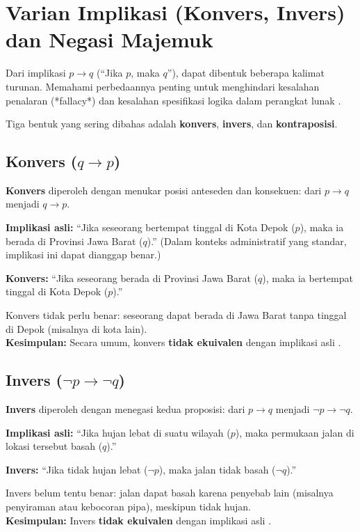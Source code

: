 \section{Varian Implikasi (Konvers, Invers) dan Negasi Majemuk}

Dari implikasi $p \rightarrow q$ (``Jika $p$, maka $q$''), dapat dibentuk beberapa kalimat turunan. Memahami perbedaannya penting untuk menghindari kesalahan penalaran (*fallacy*) dan kesalahan spesifikasi logika dalam perangkat lunak \cite{rosen2019}.

Tiga bentuk yang sering dibahas adalah \textbf{konvers}, \textbf{invers}, dan \textbf{kontraposisi}.

\subsection{Konvers ($q \rightarrow p$)}

\textbf{Konvers} diperoleh dengan menukar posisi anteseden dan konsekuen: dari $p \rightarrow q$ menjadi $q \rightarrow p$.

\begin{contoh}
\textbf{Implikasi asli:} ``Jika seseorang bertempat tinggal di Kota Depok ($p$), maka ia berada di Provinsi Jawa Barat ($q$).'' (Dalam konteks administratif yang standar, implikasi ini dapat dianggap benar.)

\textbf{Konvers:} ``Jika seseorang berada di Provinsi Jawa Barat ($q$), maka ia bertempat tinggal di Kota Depok ($p$).''

Konvers tidak perlu benar: seseorang dapat berada di Jawa Barat tanpa tinggal di Depok (misalnya di kota lain).\\
\textbf{Kesimpulan:} Secara umum, konvers \textbf{tidak ekuivalen} dengan implikasi asli \cite{wiki_first_order_logic}.
\end{contoh}

\subsection{Invers ($\neg p \rightarrow \neg q$)}

\textbf{Invers} diperoleh dengan menegasi kedua proposisi: dari $p \rightarrow q$ menjadi $\neg p \rightarrow \neg q$.

\begin{contoh}
\textbf{Implikasi asli:} ``Jika hujan lebat di suatu wilayah ($p$), maka permukaan jalan di lokasi tersebut basah ($q$).''

\textbf{Invers:} ``Jika tidak hujan lebat ($\neg p$), maka jalan tidak basah ($\neg q$).''

Invers belum tentu benar: jalan dapat basah karena penyebab lain (misalnya penyiraman atau kebocoran pipa), meskipun tidak hujan.\\
\textbf{Kesimpulan:} Invers \textbf{tidak ekuivalen} dengan implikasi asli \cite{wiki_first_order_logic}.
\end{contoh}

